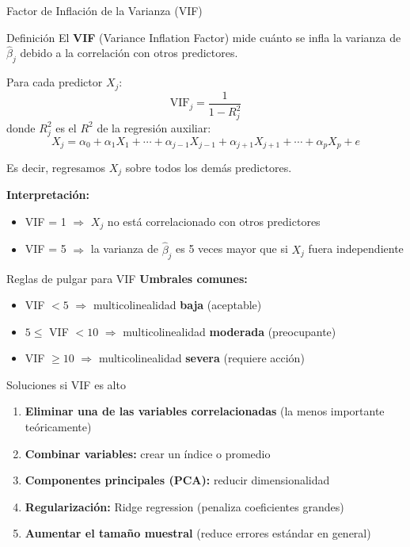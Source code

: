 \documentclass[aspectratio=169, 11pt]{beamer}
\begin{document}
\begin{frame}{Factor de Inflación de la Varianza (VIF)}
\begin{block}{Definición}
El \textbf{VIF} (Variance Inflation Factor) mide cuánto se infla la varianza de $\hat{\beta}_j$ debido a la correlación con otros predictores.

Para cada predictor $X_j$:
\[
\text{VIF}_j = \frac{1}{1 - R_j^2}
\]
donde $R_j^2$ es el $R^2$ de la regresión auxiliar:
\[
X_j = \alpha_0 + \alpha_1 X_1 + \cdots + \alpha_{j-1} X_{j-1} + \alpha_{j+1} X_{j+1} + \cdots + \alpha_p X_p + e
\]

Es decir, regresamos $X_j$ sobre todos los demás predictores.
\end{block}

\vspace{0.2cm}
\textbf{Interpretación:}
\begin{itemize}
  \item VIF = 1 $\Rightarrow$ $X_j$ no está correlacionado con otros predictores
  \item VIF = 5 $\Rightarrow$ la varianza de $\hat{\beta}_j$ es 5 veces mayor que si $X_j$ fuera independiente
\end{itemize}
\end{frame}

\begin{frame}{Reglas de pulgar para VIF}
\textbf{Umbrales comunes:}
\begin{itemize}
  \item VIF $< 5$ $\Rightarrow$ multicolinealidad \textbf{baja} (aceptable)
  \item $5 \leq$ VIF $< 10$ $\Rightarrow$ multicolinealidad \textbf{moderada} (preocupante)
  \item VIF $\geq 10$ $\Rightarrow$ multicolinealidad \textbf{severa} (requiere acción)
\end{itemize}

\vspace{0.3cm}
\begin{alertblock}{Soluciones si VIF es alto}
\begin{enumerate}
  \item \textbf{Eliminar una de las variables correlacionadas} (la menos importante teóricamente)
  \item \textbf{Combinar variables:} crear un índice o promedio
  \item \textbf{Componentes principales (PCA):} reducir dimensionalidad
  \item \textbf{Regularización:} Ridge regression (penaliza coeficientes grandes)
  \item \textbf{Aumentar el tamaño muestral} (reduce errores estándar en general)
\end{enumerate}
\end{alertblock}
\end{frame}
\end{document}
